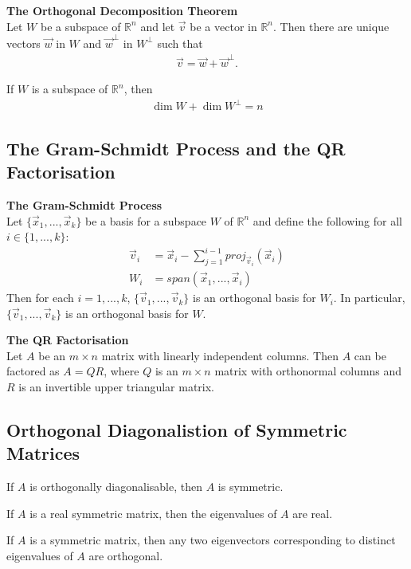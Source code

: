 \documentclass{article}
\begin{document}
\begin{theorem}
    \textbf{The Orthogonal Decomposition Theorem}\\
    Let $W$ be a subspace of $\mathbb{R}^n$ and let $\vec v$ be a vector in $\mathbb{R}^n$.
    Then there are unique vectors $\vec w$ in $W$ and $\vec w^{\perp}$ in $W^{\perp}$ such that
    \begin{align*}
        \vec v = \vec w + \vec w^{\perp}.
    \end{align*}
\end{theorem}
\setcounter{theorem}{12}
\begin{theorem}
    If $W$ is a subspace of $\mathbb{R}^n$, then
    \begin{align*}
        \dim W + \dim W^{\perp} = n
    \end{align*}
\end{theorem}
\setcounter{theorem}{14}
\subsection{The Gram-Schmidt Process and the QR Factorisation}
\begin{theorem}
    \textbf{The Gram-Schmidt Process}\\
    Let $\{\vec x_1, ..., \vec x_k\}$ be a basis for a subspace $W$ of $\mathbb{R}^n$ and define the following for all $i\in\{1,...,k\}$:
    \begin{align*}
        \vec v_i & = \vec x_i - \sum^{i-1}_{j=1} proj_{\vec v_i}(\vec x_i) \\
        W_i      & = span(\vec x_1, ..., \vec x_i)
    \end{align*}
    Then for each $i=1, ..., k$, $\{\vec v_1, ..., \vec v_k\}$ is an orthogonal basis for $W_i$. In particular, $\{\vec v_1, ..., \vec v_k\}$ is an orthogonal basis for $W$.
\end{theorem}
\begin{theorem}
    \textbf{The QR Factorisation}\\
    Let $A$ be an $m\times n$ matrix with linearly independent columns. Then $A$ can be factored as $A=QR$, where $Q$ is an $m\times n$ matrix with orthonormal columns and $R$ is an invertible upper triangular matrix.
\end{theorem}
\subsection{Orthogonal Diagonalistion of Symmetric Matrices}
\begin{theorem}
    If $A$ is orthogonally diagonalisable, then $A$ is symmetric.
\end{theorem}
\begin{theorem}
    If $A$ is a real symmetric matrix, then the eigenvalues of $A$ are real.
\end{theorem}
\begin{theorem}
    If $A$ is a symmetric matrix, then any two eigenvectors corresponding to distinct eigenvalues of $A$ are orthogonal.
\end{theorem}
\end{document}
